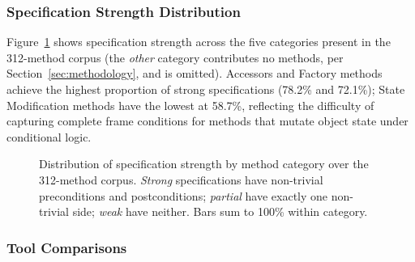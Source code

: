 \documentclass[11pt]{article}
\providecommand{\DIFdelend}{} %
\DeclareRobustCommand{\DIFdelend}{\DIFOaddend \let\includegraphics\DIFOincludegraphics} %
\begin{document}
\DIFdelend \subsubsection{Specification Strength Distribution}

Figure~\ref{fig:spec-strength} shows specification strength across the five categories present in the 312-method corpus (the \emph{other} category contributes no methods, per Section~\ref{sec:methodology}, and is omitted). Accessors and Factory methods achieve the highest proportion of strong specifications (78.2\% and 72.1\%); State Modification methods have the lowest at 58.7\%, reflecting the difficulty of capturing complete frame conditions for methods that mutate object state under conditional logic.

\begin{figure}[ht]
\centering
{}
\caption{Distribution of specification strength by method category over the 312-method corpus. \emph{Strong} specifications have non-trivial preconditions and postconditions; \emph{partial} have exactly one non-trivial side; \emph{weak} have neither. Bars sum to 100\% within category.}
\label{fig:spec-strength}
\end{figure}

\subsubsection{Tool Comparisons}
\end{document}
